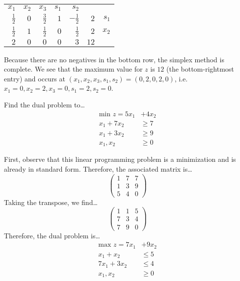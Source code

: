 \documentclass[11pt,letterpaper]{article}
\begin{document}
	\begin{table}[!ht]
	\centering
	\begin{tabular}{rrrrrr r}
	{\small $x_1$} & {\small $x_2$} & {\small $x_3$} & {\small $s_1$} & {\small $s_2$} \\
	$\frac{1}{2}$ & $0$ & $\frac{3}{2}$ & $1$ & \multicolumn{1}{r|}{$-\frac{1}{2}$} & $2$ & {\small $s_1$} \\
	$\frac{1}{2}$ & $1$ & $\frac{1}{2}$ & $0$ & \multicolumn{1}{r|}{$\frac{1}{2}$} & $2$ & {\small $x_2$} \\ \cline{1-6}
	$2$ & $0$ & $0$ & $0$ & \multicolumn{1}{r|}{$3$} & $12$ 
	\end{tabular}
	\end{table}

Because there are no negatives in the bottom row, the simplex method is complete. We see that the maximum value for $z$ is $12$ (the bottom-rightmost entry) and occurs at $(x_1, x_2, x_3, s_1, s_2)= (0, 2, 0, 2, 0)$, i.e. $x_1= 0, x_2= 2, x_3= 0, s_1= 2, s_2= 0$. 



\newpage



 Find the dual problem to\dots
	\[
	\begin{aligned}
	\text{min } z= 5x_1 &+ 4x_2 \\
	x_1 + 7x_2&\geq 7 \\
	x_1 + 3x_2&\geq 9 \\
	x_1, x_2&\geq 0 
	\end{aligned}
	\] \pspace

\sol First, observe that this linear programming problem is a minimization and is already in standard form. Therefore, the associated matrix is\dots
	\[
	\begin{pmatrix}
	1 & 7 & 7 \\
	1 & 3 & 9 \\
	5 & 4 & 0 
	\end{pmatrix}
	\]
Taking the transpose, we find\dots
	\[
	\begin{pmatrix}
	1 & 1 & 5 \\
	7 & 3 & 4 \\
	7 & 9 & 0 
	\end{pmatrix}
	\]
Therefore, the dual problem is\dots
	\[
	\begin{aligned}
	\text{max }  z= 7x_1 &+ 9x_2 \\
	x_1 + x_2&\leq 5 \\
	7x_1 + 3x_2&\leq 4 \\
	x_1, x_2&\geq 0
	\end{aligned}
	\] 
\end{document}
